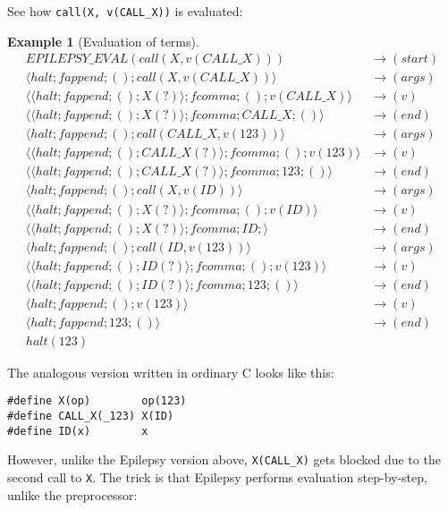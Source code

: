 \documentclass[12pt]{article}
\theoremstyle{break}
\newtheorem{example}{Example}
\begin{document}
See how \texttt{call(X, v(CALL\_X))} is evaluated:

\begin{example}[Evaluation of terms]
\small
\begin{align*}
    EPILEPSY\_EVAL(call(X, v(CALL\_X))) & \to (start) \\
    \langle halt; fappend; (); call(X, v(CALL\_X)) \rangle & \to (args) \\
    \langle \langle halt; fappend; (); X(?) \rangle; fcomma; (); v(CALL\_X) \rangle & \to (v) \\
    \langle \langle halt; fappend; (); X(?) \rangle; fcomma; CALL\_X; () \rangle & \to (end) \\
    \langle halt; fappend; (); call(CALL\_X, v(123)) \rangle & \to (args) \\
    \langle \langle halt; fappend; (); CALL\_X(?) \rangle; fcomma; (); v(123) \rangle & \to (v) \\
    \langle \langle halt; fappend; (); CALL\_X(?) \rangle; fcomma; 123; () \rangle & \to (end) \\
    \langle halt; fappend; (); call(X, v(ID)) \rangle & \to (args) \\
    \langle \langle halt; fappend; (); X(?) \rangle; fcomma; (); v(ID) \rangle & \to (v) \\
    \langle \langle halt; fappend; (); X(?) \rangle; fcomma; ID; \rangle & \to (end) \\
    \langle halt; fappend; (); call(ID, v(123)) \rangle & \to (args) \\
    \langle \langle halt; fappend; (); ID(?) \rangle; fcomma; (); v(123) \rangle & \to (v) \\
    \langle \langle halt; fappend; (); ID(?) \rangle; fcomma; 123; () \rangle & \to (end) \\
    \langle halt; fappend; (); v(123) \rangle & \to (v) \\
    \langle halt; fappend; 123; () \rangle & \to (end) \\
    halt(123) &
\end{align*}
\normalsize
\end{example}

The analogous version written in ordinary C looks like this:

\begin{verbatim}
#define X(op)        op(123)
#define CALL_X(_123) X(ID)
#define ID(x)        x
\end{verbatim}

However, unlike the Epilepsy version above, \texttt{X(CALL\_X)} gets blocked \cite{Blueprinting} due to the
second call to \texttt{X}. The trick is that Epilepsy performs evaluation step-by-step,
unlike the preprocessor:
\end{document}
